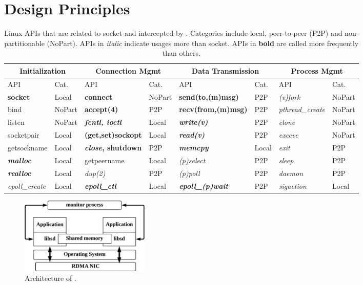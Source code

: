 \section{Design Principles}
\label{sec:architecture}


\begin{table}[t]
	\centering
	\begin{tabular}{ll|ll|ll|ll}
		\hline
		\multicolumn{2}{c|}{Initialization} &
		\multicolumn{2}{c|}{Connection Mgmt} &
		\multicolumn{2}{c|}{Data Transmission} &
		\multicolumn{2}{c}{Process Mgmt} \\
		\hline
		API & Cat. &
		API & Cat. &
		API & Cat. &
		API & Cat. \\
		\hline
		\hline
		\textbf{socket} & Local &
		\textbf{connect} & NoPart &
		\textbf{send(to,(m)msg)} & P2P &
		\textit{(v)fork} & NoPart \\
		\hline
		bind & NoPart &
		\textbf{accept(4)} & P2P &
		\textbf{recv(from,(m)msg)} & P2P &
		\textit{pthread\_create} & NoPart \\
		\hline
		listen & NoPart &
		\textbf{\textit{fcntl, ioctl}} & Local &
		\textbf{\textit{write(v)}} & P2P &
		\textit{clone} & NoPart \\
		\hline
		socketpair & Local &
		\textbf{(get,set)sockopt} & Local &
		\textbf{\textit{read(v)}} & P2P &
		\textit{execve} & NoPart \\
		\hline
		getsockname  & Local &
		\textbf{\textit{close}, shutdown} & P2P &
		\textbf{\textit{memcpy}} & Local &
		\textit{exit} & P2P \\
		\hline
		\textbf{\textit{malloc}} & Local &
		getpeername & Local &
		\textit{(p)select} & P2P &
		\textit{sleep} & P2P \\
		\hline
		\textbf{\textit{realloc}} & Local &
		\textit{dup(2)} & P2P &
		\textit{(p)poll} & P2P &
		\textit{daemon} & P2P \\
		\hline
		\textit{epoll\_create} & Local &
		\textbf{\textit{epoll\_ctl}} & Local &
		\textbf{\textit{epoll\_(p)wait}} & P2P &
		\textit{sigaction} & Local \\
		\hline
	\end{tabular}
	\caption{Linux APIs that are related to socket and intercepted by \libipc{}. Categories include local, peer-to-peer (P2P) and non-partitionable (NoPart). APIs in \textit{italic} indicate usages more than socket. APIs in \textbf{bold} are called more frequently than others.}
	\label{tab:socket-api}
\end{table}

\begin{figure}[t]
	\centering
	\includegraphics[width=0.3\textwidth]{images/architecture}
	\caption{Architecture of \sys{}.}
	\label{fig:architecture}
\end{figure}


